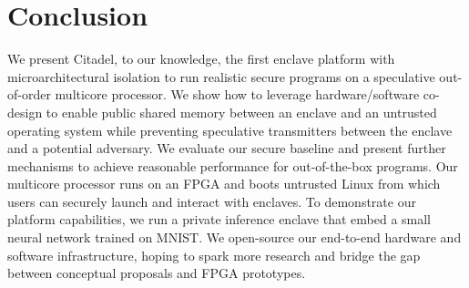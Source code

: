 \section{Conclusion}

We present Citadel, to our knowledge, the first enclave platform with microarchitectural isolation to run realistic secure programs on a speculative out-of-order multicore processor.
We show how to leverage hardware/software co-design to enable public shared memory between an enclave and an untrusted operating system while preventing speculative transmitters between the enclave and a potential adversary.
We evaluate our secure baseline and present further mechanisms to achieve reasonable performance for out-of-the-box programs.
Our multicore processor runs on an FPGA and boots untrusted Linux from which users can securely launch and interact with enclaves.
To demonstrate our platform capabilities, we run a private inference enclave that embed a small neural network trained on MNIST.
We open-source our end-to-end hardware and software infrastructure, hoping to spark more research and bridge the gap between conceptual proposals and FPGA prototypes.